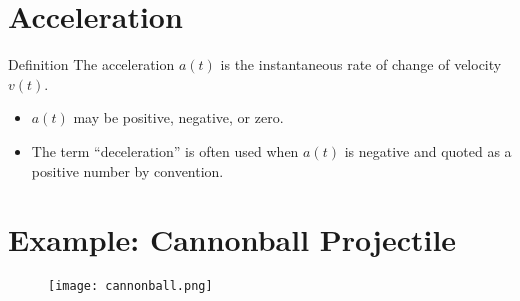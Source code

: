 \section{Acceleration}
  \begin{block}{Definition}
    The acceleration $a(t)$ is the instantaneous rate of change of velocity $v(t)$.
  \end{block}
  \begin{itemize}
    \item $a(t)$ may be positive, negative, or zero.
    \item The term “deceleration” is often used when $a(t)$ is negative and quoted as a positive number by convention.
  \end{itemize}

\section{Example: Cannonball Projectile}
  \begin{figure}
    \centering
    \texttt{[image: cannonball.png]}
  \end{figure}



